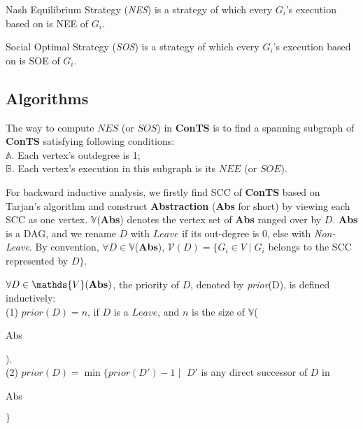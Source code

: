 \documentclass{acm_proc_article-sp}
\begin{document}
\begin{definition}
\textsf{Nash Equilibrium Strategy} (\textit{NES}) is a strategy of which every $G_{\textit{i}}$'s execution based on is NEE of $G_{\textit{i}}$.
\end{definition}

\begin{definition}
\textsf{Social Optimal Strategy} (\textit{SOS}) is a strategy of which every $G_{\textit{i}}$'s execution based on is SOE of $G_{\textit{i}}$.
\end{definition}

\subsection{Algorithms}
The way to compute $\textit{NES}$ (or $\textit{SOS}$) in \textbf{ConTS} is to find a spanning subgraph of \textbf{ConTS} satisfying following conditions:\\
$\mathds{A}$. Each vertex's outdegree is 1;\\
$\mathds{B}$. Each vertex's execution in this subgraph is its $\textit{NEE}$ (or $\textit{SOE}$).

For backward inductive analysis, we firstly find SCC of \textbf{ConTS} based on Tarjan's algorithm \cite{reinhard} and construct \textbf{Abstraction} (\textbf{Abs} for short) by viewing each SCC as one vertex. $\mathds{V}$(\textbf{Abs}) denotes the vertex set of \textbf{Abs} ranged over by $D$. \textbf{Abs} is a DAG, and we rename $D$ with $\textit{Leave}$ if its out-degree is 0, else with \textit{Non-Leave}. By convention, $\forall D\in \mathds{V}$(\textbf{Abs}), $\mathcal{V}(D)=\{G_{\textit{i}}\in V\mid G_{\textit{i}}$ belongs to the SCC represented by $D\}$.
\begin{definition}
$\forall D\in \mathds{V}(\begin{bf}{Abs}\end{bf})$, the \textsf{priority} of $D$, denoted by \textit{prior}(D), is defined inductively:\\
(1) $prior(D)=n$, if $D$ is a $\textit{Leave}$, and $n$ is the size of $\mathds{V}$(\begin{bf}{Abs}\end{bf}).\\
(2) $prior(D)=\min\{prior(D')-1\mid $ $D'$ is any direct successor of $D$ in \begin{bf}Abs\end{bf}$\}$
\end{definition}
\end{document}
